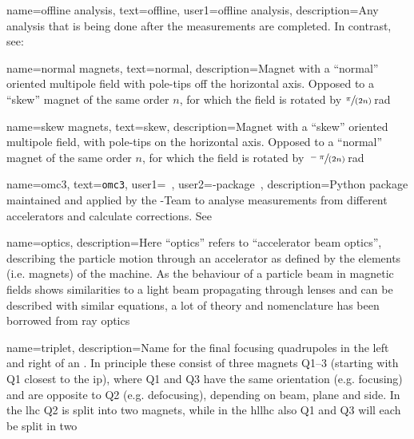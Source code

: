 {
        name={offline analysis},
        text=offline,
        user1={offline analysis},
        description={Any analysis that is being done after the measurements are completed.
        In contrast, see: }
}

{
        name={normal magnets},
        text=normal,
        description={Magnet with a ``normal'' oriented multipole field with pole-tips off the horizontal axis. 
        Opposed to a ``\gls{skew}'' magnet of the same order $n$, for which the field is rotated by $\sfrac{\pi}{(2n)}$\,\si{\radian}}
}

{
        name={skew magnets},
        text=skew,
        description={Magnet with a ``skew'' oriented multipole field, with pole-tips on the horizontal axis. 
        Opposed to a ``\gls{normal}'' magnet of the same order $n$, for which the field is rotated by $\sfrac{-\pi}{(2n)}$\,\si{\radian}}
}

{
        name={omc3},
        text={\texttt{omc3}},
        user1={\glstext{\glslabel}~\cite{OMC-TeamOMC3}},
        user2={\glstext{\glslabel}-package~\cite{OMC-TeamOMC3}},
        description={Python package maintained and applied by the -Team to analyse 
        measurements from different accelerators and calculate corrections. See~\cite{OMC-TeamOMC3}}
}

{
        name={optics},
        description={Here ``optics'' refers to ``accelerator \gls{beam} optics'',
        describing the particle motion through an accelerator as defined by the elements
        (i.e. magnets) of the machine. As the behaviour of a particle \gls{beam} in magnetic fields shows 
        similarities to a light beam propagating through lenses and can be described with similar equations,
         a lot of theory and nomenclature has been borrowed from ray optics%
        }
}

{
        name=triplet,
        description={Name for the final focusing quadrupoles in the 
         left and right of an .
        In principle these consist of three magnets Q1--3 (starting with Q1 closest to the 
        \acrshort{ip}), where Q1 and Q3 have the same orientation (e.g. focusing) and are opposite
        to Q2 (e.g. defocusing), depending on \gls{beam}, plane and side.
        In the \acrfull{lhc} Q2 is split into two magnets, 
        while in the \acrfull{hllhc} also Q1 and Q3 will each be split in two%
        }
}

